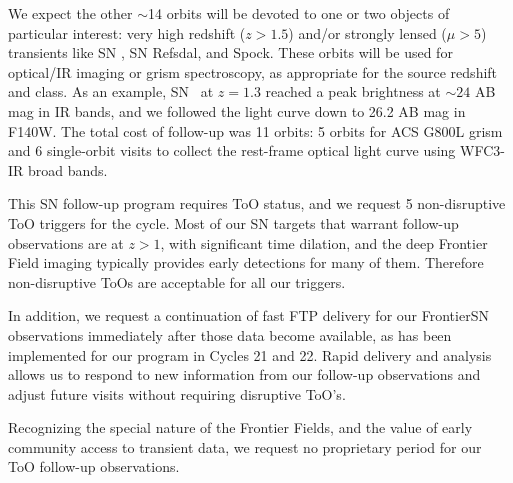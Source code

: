 \documentclass[12pt]{article}
\begin{document}
We expect the other $\sim$14 orbits will be devoted to one or two
objects of particular interest: very high redshift ($z>1.5$) and/or
strongly lensed ($\mu>5$) transients like SN \tomas, SN Refsdal, and
Spock.  These orbits will be used for optical/IR imaging or grism
spectroscopy, as appropriate for the source redshift and class.  As an
example, SN \tomas\ at $z=1.3$ reached a peak brightness at $\sim24$
AB mag in IR bands, and we followed the light curve down to 26.2 AB mag
in F140W.  The total cost of follow-up was 11 orbits: 5 orbits for ACS
G800L grism and 6 single-orbit visits to collect the rest-frame
optical light curve using WFC3-IR broad bands.






%
%
\specialreq             %


This SN follow-up program requires ToO status, and we request 5
non-disruptive ToO triggers for the cycle.  Most of our SN targets
that warrant follow-up observations are at $z>1$, with significant
time dilation, and the deep Frontier Field imaging typically provides
early detections for many of them.  Therefore non-disruptive ToOs are
acceptable for all our triggers.

In addition, we request a continuation of fast FTP delivery for our
FrontierSN observations immediately after those data become available,
as has been implemented for our program in Cycles 21 and 22.  Rapid
delivery and analysis allows us to respond to new information from our
follow-up observations and adjust future visits without requiring
disruptive ToO's.

Recognizing the special nature of the Frontier Fields, and the value
of early community access to transient data, we request no proprietary
period for our ToO follow-up observations.


\end{document}

